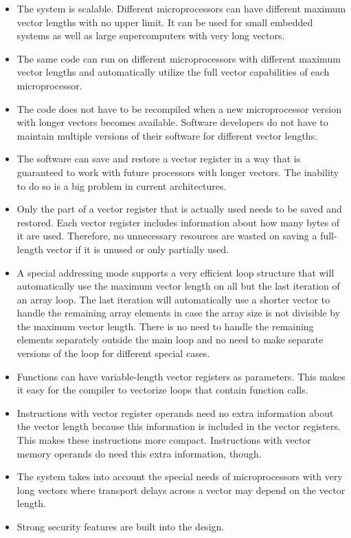 \documentclass[forwardcom.tex]{subfiles}
\begin{document}
\begin{itemize}
\item The system is scalable. Different microprocessors can have different maximum vector lengths with no upper limit. It can be used for small embedded systems as well as large supercomputers with very long vectors. 

\item The same code can run on different microprocessors with different maximum vector lengths and automatically utilize the full vector capabilities of each microprocessor. 

\item The code does not have to be recompiled when a new microprocessor version with longer vectors becomes available. Software developers do not have to maintain multiple versions of their software for different vector lengths. 

\item The software can save and restore a vector register in a way that is guaranteed to work with future processors with longer vectors. The inability to do so is a big problem in current architectures. 

\item Only the part of a vector register that is actually used needs to be saved and restored. Each vector register includes information about how many bytes of it are used. Therefore, no unnecessary resources are wasted on saving a full-length vector if it is unused or only partially used. 

\item A special addressing mode supports a very efficient loop structure that will automatically use the maximum vector length on all but the last iteration of an array loop. The last iteration will automatically use a shorter vector to handle the remaining array elements in case the array size is not divisible by the maximum vector length. There is no need to handle the remaining elements separately outside the main loop and no need to make separate versions of the loop for different special cases. 

\item Functions can have variable-length vector registers as parameters. This makes it easy for the compiler to vectorize loops that contain function calls. 

\item Instructions with vector register operands need no extra information about the vector length because this information is included in the vector registers. This makes these instructions more compact. Instructions with vector memory operands do need this extra information, though.

\item The system takes into account the special needs of microprocessors with very long vectors where transport delays across a vector may depend on the vector length.

\item Strong security features are built into the design.
\end{itemize}
\end{document}

